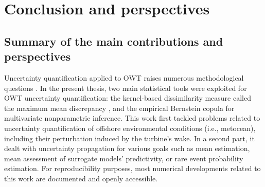 \chapter*{Conclusion and perspectives}


\section*{Summary of the main contributions and perspectives}
Uncertainty quantification applied to OWT raises numerous methodological questions \citep{veers_2019_review}. 
In the present thesis, two main statistical tools were exploited for OWT uncertainty quantification: the kernel-based dissimilarity measure called the maximum mean discrepancy \citep{gretton_2006}, and the empirical Bernstein copula \citep{sancetta_satchell_2004} for multivariate nonparametric inference. 
This work first tackled problems related to uncertainty quantification of offshore environmental conditions (i.e., metocean), including their perturbation induced by the turbine's wake. 
In a second part, it dealt with uncertainty propagation for various goals such as mean estimation, mean assessment of surrogate models' predictivity, or rare event probability estimation.
For reproducibility purposes, most numerical developments related to this work are documented and openly accessible. 

